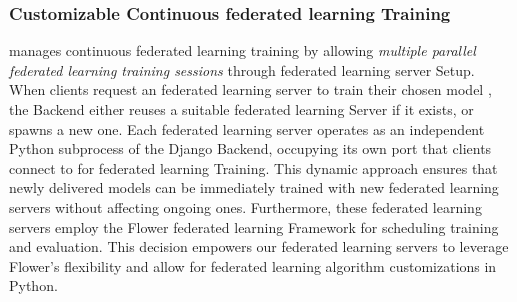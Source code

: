 \subsubsection{Customizable Continuous federated learning Training}
\fedkit manages continuous federated learning training by allowing \textit{multiple parallel federated learning training sessions}
through federated learning server Setup.
When clients request an federated learning server to
train their chosen model \model{},
the Backend either reuses a suitable federated learning Server \fs{} if it exists,
or spawns a new one.
Each federated learning server
operates as an independent Python subprocess of the Django Backend,
occupying its own port that
clients connect to for federated learning Training.
This dynamic approach ensures that
newly delivered models can be immediately trained with new federated learning servers
without affecting ongoing ones.
Furthermore,
these federated learning servers employ the Flower federated learning Framework for
scheduling training and evaluation.
This decision empowers our federated learning servers to leverage Flower's flexibility and
allow for federated learning algorithm customizations in Python.
